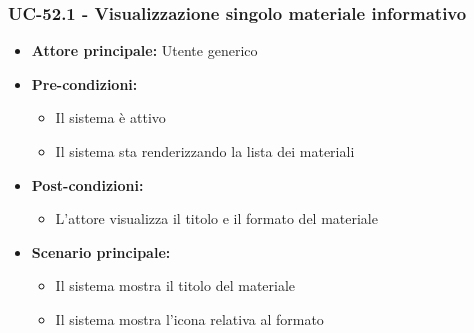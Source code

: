 \documentclass[a4paper,12pt]{article}
\begin{document}
\subsubsection{UC-52.1 - Visualizzazione singolo materiale informativo} \label{subsec:UC-52.1}
\begin{itemize}
    \item \textbf{Attore principale:} Utente generico
    \item \textbf{Pre-condizioni:} 
    \begin{itemize}
        \item Il sistema è attivo
        \item Il sistema sta renderizzando la lista dei materiali
    \end{itemize}
    \item \textbf{Post-condizioni:}
    \begin{itemize}
        \item L'attore visualizza il titolo e il formato del materiale
    \end{itemize}
    \item \textbf{Scenario principale:} 
    \begin{itemize}
        \item Il sistema mostra il titolo del materiale
        \item Il sistema mostra l'icona relativa al formato
    \end{itemize}
\end{itemize}
\end{document}
